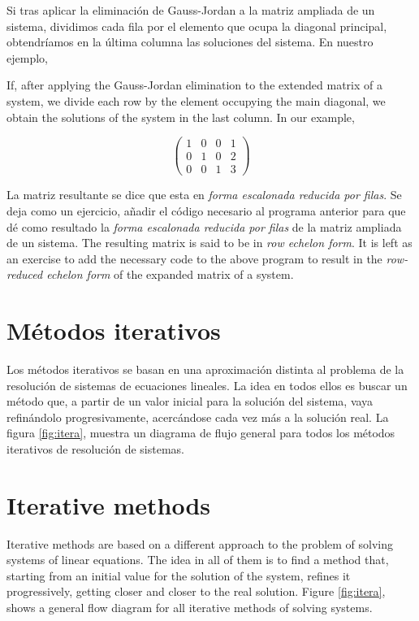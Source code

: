 \begin{paracol}{2}

Si tras aplicar la eliminación de Gauss-Jordan a la matriz ampliada de un sistema, dividimos cada fila por el elemento que ocupa la diagonal principal, obtendríamos en la última columna las soluciones del sistema. En nuestro ejemplo,

\switchcolumn

If, after applying the Gauss-Jordan elimination to the extended matrix of a system, we divide each row by the element occupying the main diagonal, we obtain the solutions of the system in the last column. In our example,

\end{paracol}
\begin{equation*}
\begin{pmatrix}
1&     0&     0&    1\\
 0&    1&    0&    2\\
 0&     0&     1&    3
\end{pmatrix}
\end{equation*}

\begin{paracol}{2}
La matriz resultante se dice que esta en \emph{forma escalonada reducida por filas}. Se deja como un ejercicio, añadir el código necesario al programa anterior para que dé como resultado la \emph{forma escalonada reducida por filas} de la matriz ampliada de un sistema. 
\switchcolumn
The resulting matrix is said to be in \emph{row echelon form}. It is left as an exercise to add the necessary code to the above program to result in the \emph{row-reduced echelon form} of the expanded matrix of a system. 
\end{paracol}
\begin{paracol}{2}
\section{Métodos iterativos}
Los métodos iterativos se basan en una aproximación distinta al problema de la resolución de sistemas de ecuaciones lineales. La idea en todos ellos es buscar un método que, a partir de un valor inicial para la solución del sistema, vaya refinándolo progresivamente, acercándose cada vez más a la solución real. La figura \ref{fig:itera}, muestra un diagrama de flujo general para todos los métodos iterativos de resolución de sistemas.

\switchcolumn
\section{Iterative methods}
Iterative methods are based on a different approach to the problem of solving systems of linear equations. The idea in all of them is to find a method that, starting from an initial value for the solution of the system, refines it progressively, getting closer and closer to the real solution. Figure \ref{fig:itera}, shows a general flow diagram for all iterative methods of solving systems.
    
\end{paracol}

